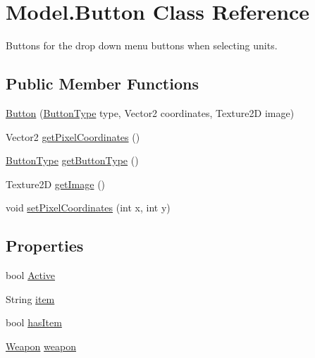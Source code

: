 \hypertarget{class_model_1_1_button}{}\section{Model.\+Button Class Reference}
\label{class_model_1_1_button}


Buttons for the drop down menu buttons when selecting units.  


\subsection*{Public Member Functions}
\begin{DoxyCompactItemize}
\item 
\hyperlink{class_model_1_1_button_a4f1b6a37e4e289588f02d86662122999}{Button} (\hyperlink{namespace_model_ac76b3489c9d704f49912608bd36cd0e7}{Button\+Type} type, Vector2 coordinates, Texture2D image)
\item 
Vector2 \hyperlink{class_model_1_1_button_a85c03ed625cb7b0a71acaff71c0b9720}{get\+Pixel\+Coordinates} ()
\item 
\hyperlink{namespace_model_ac76b3489c9d704f49912608bd36cd0e7}{Button\+Type} \hyperlink{class_model_1_1_button_afe5e70c92c884a901712714f8da9bdb8}{get\+Button\+Type} ()
\item 
Texture2D \hyperlink{class_model_1_1_button_a5de177a3bb153c7679d2b051c45563d2}{get\+Image} ()
\item 
void \hyperlink{class_model_1_1_button_a133007487f6d8537f87c89070655f384}{set\+Pixel\+Coordinates} (int x, int y)
\end{DoxyCompactItemize}
\subsection*{Properties}
\begin{DoxyCompactItemize}
\item 
bool \hyperlink{class_model_1_1_button_a77f2ad040a06defce5c3e8b5cd641a71}{Active}
\item 
String \hyperlink{class_model_1_1_button_a9aff2e95ee3d23e877593e32a40e99bf}{item}
\item 
bool \hyperlink{class_model_1_1_button_a6b834edf8485c0dc7a10abfd43c38e77}{has\+Item}
\item 
\hyperlink{interface_model_1_1_weapon_module_1_1_weapon}{Weapon} \hyperlink{class_model_1_1_button_af435b2d384ae925bfeb6bda7c49db402}{weapon}
\end{DoxyCompactItemize}


